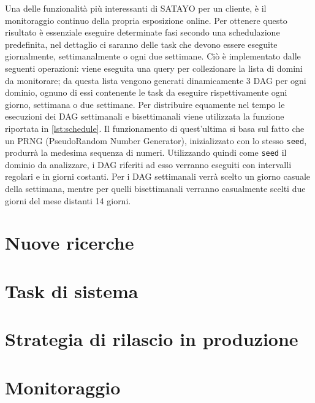 Una delle funzionalità più interessanti di SATAYO per un cliente, è il monitoraggio
continuo della propria esposizione online. Per ottenere questo risultato è
essenziale eseguire determinate fasi secondo una schedulazione predefinita, nel dettaglio
ci saranno delle task che devono essere eseguite giornalmente, settimanalmente o
ogni due settimane. Ciò è implementato dalle seguenti operazioni: viene eseguita
una query per collezionare la lista di domini da monitorare; da questa lista vengono
generati dinamicamente 3 DAG per ogni dominio, ognuno di essi contenente le task
da eseguire rispettivamente ogni giorno, settimana o due settimane. Per
distribuire equamente nel tempo le esecuzioni dei DAG settimanali e
bisettimanali viene utilizzata la funzione riportata in \ref{lst:schedule}. Il funzionamento
di quest'ultima si basa sul fatto che un PRNG (PseudoRandom Number Generator)\cite{py-random},
inizializzato con lo stesso \texttt{seed}, produrrà la medesima sequenza di numeri.
Utilizzando quindi come \texttt{seed} il dominio da analizzare, i DAG riferiti
ad esso verranno eseguiti con intervalli regolari e in giorni costanti. Per i DAG
settimanali verrà scelto un giorno casuale della settimana, mentre per quelli
bisettimanali verranno casualmente scelti due giorni del mese distanti 14 giorni.



\section{Nuove ricerche}
\label{sec:nuove}

\lipsum[1]

\section{Task di sistema}
\label{sec:sistema}

\lipsum[1]

\section{Strategia di rilascio in produzione}
\label{sec:deployment}

\lipsum[1]

\section{Monitoraggio}
\label{sec:monitoraggio}

\lipsum[1]